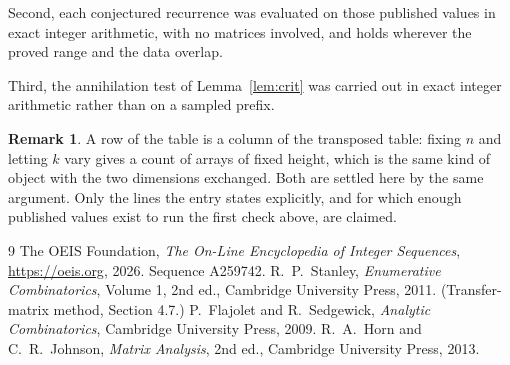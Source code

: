 \documentclass[11pt,a4paper]{article}
\theoremstyle{plain}
\theoremstyle{definition}
\newtheorem{remark}[theorem]{Remark}
\begin{document}
Second, each conjectured recurrence was evaluated on those published values in exact
integer arithmetic, with no matrices involved, and holds wherever the proved range and the
data overlap.

Third, the annihilation test of Lemma~\ref{lem:crit} was carried out in exact integer
arithmetic rather than on a sampled prefix.

\begin{remark}
A row of the table is a column of the transposed table: fixing $n$ and letting $k$ vary gives a
count of arrays of fixed height, which is the same kind of object with the two dimensions
exchanged. Both are settled here by the same argument. Only the lines the entry states
explicitly, and for which enough published values exist to run the first check above, are
claimed.
\end{remark}

\begin{thebibliography}{9}
 The OEIS Foundation, \emph{The On-Line Encyclopedia of Integer
Sequences}, \url{https://oeis.org}, 2026. Sequence A259742.
 R.~P.~Stanley, \emph{Enumerative Combinatorics}, Volume 1, 2nd ed.,
Cambridge University Press, 2011. (Transfer-matrix method, Section 4.7.)
 P.~Flajolet and R.~Sedgewick, \emph{Analytic Combinatorics}, Cambridge
University Press, 2009.
 R.~A.~Horn and C.~R.~Johnson, \emph{Matrix Analysis}, 2nd ed., Cambridge
University Press, 2013.
\end{thebibliography}
\end{document}
